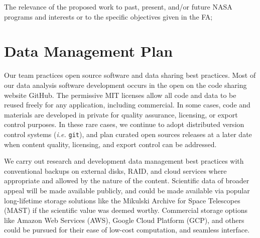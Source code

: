 \documentclass[12pt]{article}
\begin{document}
The relevance of the proposed work to past, present, and/or future
NASA programs and interests or to the specific objectives given in the
FA;



\cleardoublepage


\section*{Data Management Plan}


Our team practices open source software and data sharing best practices.  Most of our data analysis software development occurs in the open on the code sharing website GitHub.  The permissive MIT licenses allow all code and data to be reused freely for any application, including commercial.  In some cases, code and materials are developed in private for quality assurance, licensing, or export control purposes.  In these rare cases, we continue to adopt distributed version control systems (\emph{i.e.} \texttt{git}), and plan curated open sources releases at a later date when content quality, licensing, and export control can be addressed.

We carry out research and development data management best practices with conventional backups on external disks, RAID, and cloud services where appropriate and allowed by the nature of the content.  Scientific data of broader appeal will be made available publicly, and could be made available via popular long-lifetime storage solutions like the Mikulski Archive for Space Telescopes (MAST) if the scientific value was deemed worthy.  Commercial storage options like Amazon Web Services (AWS), Google Cloud Platform (GCP), and others could be pursued for their ease of low-cost computation, and seamless interface.




\cleardoublepage





\end{document}
